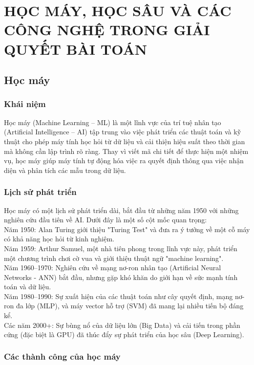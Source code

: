 \documentclass[12pt]{report}
\begin{document}
\chapter{HỌC MÁY, HỌC SÂU VÀ CÁC CÔNG NGHỆ TRONG GIẢI QUYẾT BÀI TOÁN}

\section{Học máy}

\subsection{Khái niệm}

Học máy (Machine Learning – ML) là một lĩnh vực của trí tuệ nhân tạo (Artificial Intelligence – AI) tập trung vào việc phát triển các thuật toán và kỹ thuật cho phép máy tính học hỏi từ dữ liệu và cải thiện hiệu suất theo thời gian mà không cần lập trình rõ ràng. Thay vì viết mã chi tiết để thực hiện một nhiệm vụ, học máy giúp máy tính tự động hóa việc ra quyết định thông qua việc nhận diện và phân tích các mẫu trong dữ liệu.

\subsection{Lịch sử phát triển}

Học máy có một lịch sử phát triển dài, bắt đầu từ những năm 1950 với những nghiên cứu đầu tiên về AI. Dưới đây là một số cột mốc quan trọng:\\
Năm 1950: Alan Turing giới thiệu "Turing Test" \cite{turing1950} và đưa ra ý tưởng về một cỗ máy có khả năng học hỏi từ kinh nghiệm.\\
Năm 1959: Arthur Samuel, một nhà tiên phong trong lĩnh vực này, phát triển một chương trình chơi cờ vua và giới thiệu thuật ngữ "machine learning".\\
Năm 1960–1970: Nghiên cứu về mạng nơ-ron nhân tạo (Artificial Neural Networks - ANN) bắt đầu, nhưng gặp khó khăn do giới hạn về sức mạnh tính toán và dữ liệu.\\
Năm 1980–1990: Sự xuất hiện của các thuật toán như cây quyết định, mạng nơ-ron đa lớp (MLP), và máy vector hỗ trợ (SVM) đã mang lại nhiều tiến bộ đáng kể.\\
Các năm 2000+: Sự bùng nổ của dữ liệu lớn (Big Data) và cải tiến trong phần cứng (đặc biệt là GPU) đã thúc đẩy sự phát triển của học sâu (Deep Learning).

\subsection{Các thành công của học máy}
\end{document}

